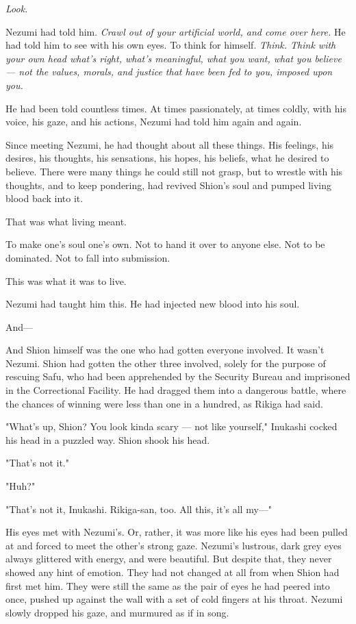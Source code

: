 \emph{Look.}

Nezumi had told him. \emph{Crawl out of your artificial world, and come over
here.} He had told him to see with his own eyes. To think for himself.
\emph{Think. Think with your own head what's right, what's meaningful, what
you want, what you believe --- not the values, morals, and justice that
have been fed to you, imposed upon you.}

He had been told countless times. At times passionately, at times
coldly, with his voice, his gaze, and his actions, Nezumi had told him
again and again.

Since meeting Nezumi, he had thought about all these things. His
feelings, his desires, his thoughts, his sensations, his hopes, his
beliefs, what he desired to believe. There were many things he could
still not grasp, but to wrestle with his thoughts, and to keep
pondering, had revived Shion's soul and pumped living blood back into
it.

That was what living meant.

To make one's soul one's own. Not to hand it over to anyone else. Not to
be dominated. Not to fall into submission.

This was what it was to live.

Nezumi had taught him this. He had injected new blood into his soul.

And---

And Shion himself was the one who had gotten everyone involved. It
wasn't Nezumi. Shion had gotten the other three involved, solely for the
purpose of rescuing Safu, who had been apprehended by the Security
Bureau and imprisoned in the Correctional Facility. He had dragged them
into a dangerous battle, where the chances of winning were less than one
in a hundred, as Rikiga had said.

"What's up, Shion? You look kinda scary --- not like yourself," Inukashi
cocked his head in a puzzled way. Shion shook his head.

"That's not it."

"Huh?"

"That's not it, Inukashi. Rikiga-san, too. All this, it's all my---"

His eyes met with Nezumi's. Or, rather, it was more like his eyes had
been pulled at and forced to meet the other's strong gaze. Nezumi's
lustrous, dark grey eyes always glittered with energy, and were
beautiful. But despite that, they never showed any hint of emotion. They
had not changed at all from when Shion had first met him. They were
still the same as the pair of eyes he had peered into once, pushed up
against the wall with a set of cold fingers at his throat. Nezumi slowly
dropped his gaze, and murmured as if in song.


